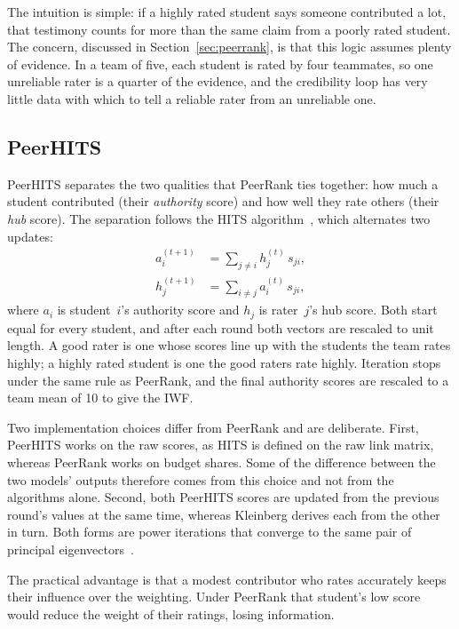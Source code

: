 The intuition is simple: if a highly rated student says someone contributed a
lot, that testimony counts for more than the same claim from a poorly rated
student. The concern, discussed in Section~\ref{sec:peerrank}, is that this
logic assumes plenty of evidence. In a team of five, each student is rated by
four teammates, so one unreliable rater is a quarter of the evidence, and the
credibility loop has very little data with which to tell a reliable rater from
an unreliable one.

\subsection{PeerHITS}
\label{sec:peerhits-method}

PeerHITS separates the two qualities that PeerRank ties together: how much a
student contributed (their \emph{authority} score) and how well they rate
others (their \emph{hub} score). The separation follows the HITS
algorithm~\citep{kleinberg1999hits}, which alternates two updates:
\begin{align}
  a_i^{(t+1)} &= \sum_{j \ne i} h_j^{(t)} \, s_{ji},
  \label{eq:hits-auth} \\
  h_j^{(t+1)} &= \sum_{i \ne j} a_i^{(t)} \, s_{ji},
  \label{eq:hits-hub}
\end{align}
where $a_i$ is student~$i$'s authority score and $h_j$ is rater~$j$'s hub
score. Both start equal for every student, and after each round both vectors
are rescaled to unit length. A good rater is one whose scores line up with the
students the team rates highly; a highly rated student is one the good raters
rate highly. Iteration stops under the same rule as PeerRank, and the final
authority scores are rescaled to a team mean of 10 to give the IWF.

Two implementation choices differ from PeerRank and are deliberate. First,
PeerHITS works on the raw scores, as HITS is defined on the raw link matrix,
whereas PeerRank works on budget shares. Some of the difference between the two
models' outputs therefore comes from this choice and not from the algorithms
alone. Second, both PeerHITS scores are updated from the previous round's values
at the same time, whereas Kleinberg derives each from the other in turn. Both
forms are power iterations that converge to the same pair of principal
eigenvectors~\citep{kleinberg1999hits}.

The practical advantage is that a modest contributor who rates accurately keeps
their influence over the weighting. Under PeerRank that student's low score
would reduce the weight of their ratings, losing information.

